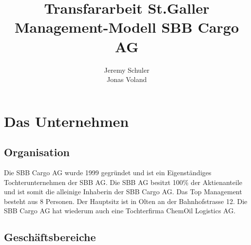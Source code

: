 \documentclass{article}
\title{Transfararbeit St.Galler Management-Modell SBB Cargo AG}
\author{
    Jeremy Schuler\\
    Jonas Voland
}
\begin{document}
\begin{titlepage}
    \maketitle
\end{titlepage}

\setcounter{page}{2}

\tableofcontents

\newpage

\section{Das Unternehmen}

\subsection{Organisation}

Die SBB Cargo AG wurde 1999 gegründet und ist ein Eigenständiges Tochterunternehmen der SBB AG.
Die SBB AG besitzt 100\% der Aktienanteile und ist somit die alleinige Inhaberin der SBB Cargo AG.
Das Top Management besteht aus 8 Personen.
Der Hauptsitz ist in Olten an der Bahnhofstrasse 12.
Die SBB Cargo AG hat wiederum auch eine Tochterfirma ChemOil Logistics AG. \cite{test}

\subsection{Geschäftsbereiche}

\newpage

\printbibliography
\end{document}
